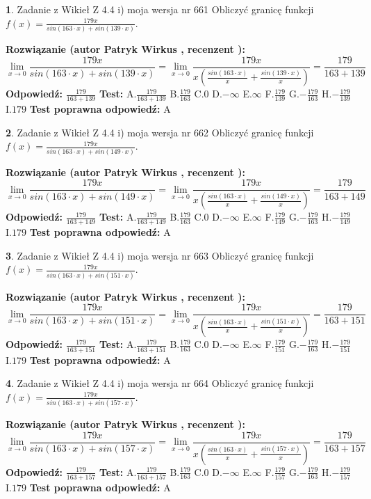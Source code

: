 \documentclass[12pt, a4paper]{article}
\theoremstyle{definition} %
\newtheorem{zad}{}
\newcommand{\zadStart}[1]{\begin{zad}#1\newline}
\newcommand{\zadStop}{\end{zad}}
\newcommand{\rozwStart}[2]{\noindent \textbf{Rozwiązanie (autor #1 , recenzent #2): }\newline}
\newcommand{\rozwStop}{\newline}
\newcommand{\odpStart}{\noindent \textbf{Odpowiedź:}\newline}
\newcommand{\odpStop}{\newline}
\newcommand{\testStart}{\noindent \textbf{Test:}\newline}
\newcommand{\testStop}{\newline}
\newcommand{\kluczStart}{\noindent \textbf{Test poprawna odpowiedź:}\newline}
\newcommand{\kluczStop}{\newline}
\begin{document}
\zadStart{Zadanie z Wikieł Z 4.4 i) moja wersja nr 661}
Obliczyć granicę funkcji $f(x)=\frac{179x}{sin(163\cdot x) +sin(139\cdot x)}$.
\zadStop
\rozwStart{Patryk Wirkus}{}
$$\lim\limits_{x\to 0}\frac{179x}{sin(163\cdot x) +sin(139\cdot x)}=\lim\limits_{x\to 0}\frac{179x}{x(\frac{sin(163\cdot x)}{x}+\frac{sin(139\cdot x)}{x})}=\frac{179}{163+139}$$
\rozwStop
\odpStart
$\frac{179}{163+139}$
\odpStop
\testStart
A.$\frac{179}{163+139}$
B.$\frac{179}{163}$
C.$0$
D.$-\infty$
E.$\infty$
F.$\frac{179}{139}$
G.$-\frac{179}{163}$
H.$-\frac{179}{139}$
I.$179$
\testStop
\kluczStart
A
\kluczStop



\zadStart{Zadanie z Wikieł Z 4.4 i) moja wersja nr 662}
Obliczyć granicę funkcji $f(x)=\frac{179x}{sin(163\cdot x) +sin(149\cdot x)}$.
\zadStop
\rozwStart{Patryk Wirkus}{}
$$\lim\limits_{x\to 0}\frac{179x}{sin(163\cdot x) +sin(149\cdot x)}=\lim\limits_{x\to 0}\frac{179x}{x(\frac{sin(163\cdot x)}{x}+\frac{sin(149\cdot x)}{x})}=\frac{179}{163+149}$$
\rozwStop
\odpStart
$\frac{179}{163+149}$
\odpStop
\testStart
A.$\frac{179}{163+149}$
B.$\frac{179}{163}$
C.$0$
D.$-\infty$
E.$\infty$
F.$\frac{179}{149}$
G.$-\frac{179}{163}$
H.$-\frac{179}{149}$
I.$179$
\testStop
\kluczStart
A
\kluczStop



\zadStart{Zadanie z Wikieł Z 4.4 i) moja wersja nr 663}
Obliczyć granicę funkcji $f(x)=\frac{179x}{sin(163\cdot x) +sin(151\cdot x)}$.
\zadStop
\rozwStart{Patryk Wirkus}{}
$$\lim\limits_{x\to 0}\frac{179x}{sin(163\cdot x) +sin(151\cdot x)}=\lim\limits_{x\to 0}\frac{179x}{x(\frac{sin(163\cdot x)}{x}+\frac{sin(151\cdot x)}{x})}=\frac{179}{163+151}$$
\rozwStop
\odpStart
$\frac{179}{163+151}$
\odpStop
\testStart
A.$\frac{179}{163+151}$
B.$\frac{179}{163}$
C.$0$
D.$-\infty$
E.$\infty$
F.$\frac{179}{151}$
G.$-\frac{179}{163}$
H.$-\frac{179}{151}$
I.$179$
\testStop
\kluczStart
A
\kluczStop



\zadStart{Zadanie z Wikieł Z 4.4 i) moja wersja nr 664}
Obliczyć granicę funkcji $f(x)=\frac{179x}{sin(163\cdot x) +sin(157\cdot x)}$.
\zadStop
\rozwStart{Patryk Wirkus}{}
$$\lim\limits_{x\to 0}\frac{179x}{sin(163\cdot x) +sin(157\cdot x)}=\lim\limits_{x\to 0}\frac{179x}{x(\frac{sin(163\cdot x)}{x}+\frac{sin(157\cdot x)}{x})}=\frac{179}{163+157}$$
\rozwStop
\odpStart
$\frac{179}{163+157}$
\odpStop
\testStart
A.$\frac{179}{163+157}$
B.$\frac{179}{163}$
C.$0$
D.$-\infty$
E.$\infty$
F.$\frac{179}{157}$
G.$-\frac{179}{163}$
H.$-\frac{179}{157}$
I.$179$
\testStop
\kluczStart
A
\kluczStop
\end{document}
